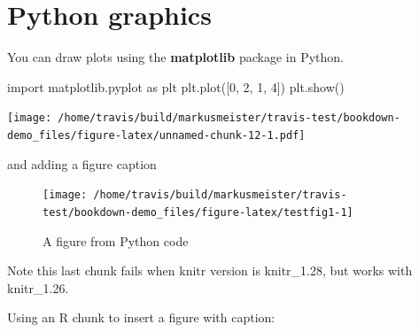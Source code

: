 \documentclass[]{book}
\newenvironment{Shaded}{\begin{snugshade}}{\end{snugshade}}
\newcommand{\DecValTok}[1]{\textcolor[rgb]{0.00,0.00,0.81}{#1}}
\newcommand{\ImportTok}[1]{#1}
\newcommand{\NormalTok}[1]{#1}
\begin{document}
\hypertarget{python-graphics}{%
\section{Python graphics}\label{python-graphics}}

You can draw plots using the \textbf{matplotlib} package in Python.

\begin{Shaded}
\begin{Highlighting}[]
\ImportTok{import}\NormalTok{ matplotlib.pyplot }\ImportTok{as}\NormalTok{ plt}
\NormalTok{plt.plot([}\DecValTok{0}\NormalTok{, }\DecValTok{2}\NormalTok{, }\DecValTok{1}\NormalTok{, }\DecValTok{4}\NormalTok{])}
\NormalTok{plt.show()}
\end{Highlighting}
\end{Shaded}

\texttt{[image: /home/travis/build/markusmeister/travis-test/bookdown-demo\_files/figure-latex/unnamed-chunk-12-1.pdf]}

and adding a figure caption

\begin{Shaded}
\end{Shaded}

\begin{figure}

{\centering \texttt{[image: /home/travis/build/markusmeister/travis-test/bookdown-demo\_files/figure-latex/testfig1-1]} 

}

\caption{A figure from Python code}\label{fig:testfig1}
\end{figure}

Note this last chunk fails when knitr version is knitr\_1.28, but works with knitr\_1.26.

Using an R chunk to insert a figure with caption:

\begin{Shaded}
\end{Shaded}
\end{document}

